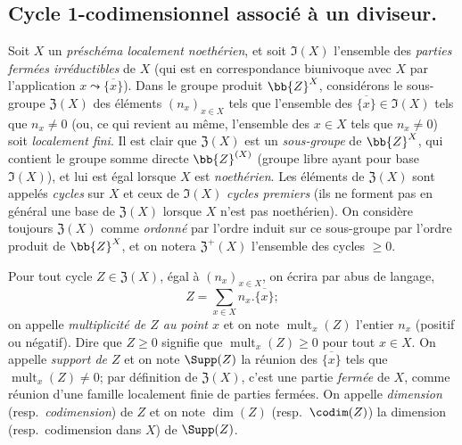 \subsection{Cycle 1-codimensionnel associé à un diviseur.}
\label{IV.21.6}

\begin{env}[21.6.1]
Soit $X$ un \emph{préschéma localement noethérien}, et soit $\mathfrak{I}(X)$ l'ensemble des \emph{parties fermées irréductibles} de $X$ (qui est en correspondance biunivoque avec $X$ par l'application $x\leadsto\overline{\{x\}}$).
Dans le groupe produit $\bb{Z}^X$, considérons le sous-groupe $\mathfrak{Z}(X)$ des éléments $(n_x)_{x\in X}$ tels que l'ensemble des $\overline{\{x\}}\in\mathfrak{I}(X)$ tels que $n_x\neq0$ (ou, ce qui revient
au même, l'ensemble des $x\in X$ tels que $n_x\neq0$) soit \emph{localement fini}.
Il est clair que $\mathfrak{Z}(X)$ est un \emph{sous-groupe} de $\bb{Z}^X$, qui contient le groupe somme directe $\bb{Z}^{(X)}$ (groupe libre ayant pour base $\mathfrak{I}(X)$), et lui est égal lorsque $X$ est \emph{noethérien}.
Les éléments de $\mathfrak{Z}(X)$ sont appelés \emph{cycles} sur $X$ et ceux de $\mathfrak{I}(X)$ \emph{cycles premiers} (ils ne forment pas en général une base de $\mathfrak{Z}(X)$ lorsque $X$ n'est pas noethérien).
On considère toujours $\mathfrak{Z}(X)$ comme \emph{ordonné} par l'ordre induit sur ce sous-groupe par l'ordre produit de $\bb{Z}^X$, et on notera $\mathfrak{Z}^+(X)$ l'ensemble des cycles $\geq0$.

Pour tout cycle $Z\in\mathfrak{Z}(X)$, égal à $(n_x)_{x\in X}$, on écrira par abus de langage,
\[
  Z=\sum_{x\in X}n_x.\overline{\{x\}};
\]
on appelle \emph{multiplicité de $Z$ au point $x$} et on note $\operatorname{mult}_x(Z)$ l'entier $n_x$ (positif ou négatif).
Dire que $Z\geq0$ signifie que $\operatorname{mult}_x(Z)\geq0$ pour tout $x\in X$.
On appelle \emph{support de $Z$} et on note $\Supp(Z)$ la réunion des $\overline{\{x\}}$ tels que $\operatorname{mult}_x(Z)\neq0$;
par définition de $\mathfrak{Z}(X)$, c'est une partie \emph{fermée} de $X$, comme réunion d'une famille localement finie de parties fermées.
On appelle \emph{dimension} (resp.\ \emph{codimension}) de $Z$ et on note $\dim(Z)$ (resp.\ $\codim(Z)$) la dimension (resp.\ codimension dans $X$) de $\Supp(Z)$.
\end{env}

